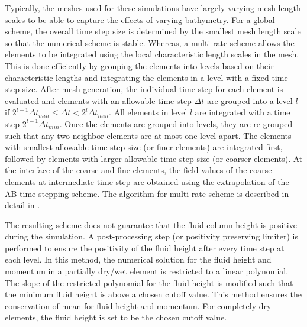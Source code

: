 Typically, the meshes used for these simulations have largely varying mesh length scales to be able to capture the effects of varying bathymetry. For a global scheme, the overall time step size is determined by the smallest mesh length scale so that the numerical scheme is stable. Whereas, a multi-rate scheme allows the elements to be integrated using the local characteristic length scales in the mesh. This is done efficiently by grouping the elements into levels based on their characteristic lengths and integrating the elements in a level with a fixed time step size. After mesh generation, the individual time step for each element is evaluated and elements with an allowable time step $\Delta t$ are grouped into a level $l$ if $2^{l-1} \Delta t _{min} \le \Delta t < 2^l \Delta t _{min}$. All elements in level $l$ are integrated with a time step $2^{l-1} \Delta t_{min}$. Once the elements are grouped into levels, they are re-grouped such that any two neighbor elements are at most one level apart. The elements with smallest allowable time step size (or finer elements) are integrated first, followed by elements with larger allowable time step size (or coarser elements). At the interface of the coarse and fine elements, the field values of the coarse elements at intermediate time step are obtained using the extrapolation of the AB time stepping scheme. The algorithm for multi-rate scheme is described in detail in \cite{gandham2014swe}. 

The resulting scheme does not guarantee that the fluid column height is positive during the simulation. A post-processing step (or positivity preserving limiter) is performed to ensure the positivity of the fluid height after every time step at each level. In this method, the numerical solution for the fluid height and momentum in a partially dry/wet element is restricted to a linear polynomial. The slope of the restricted polynomial for the fluid height is modified such that the minimum fluid height is above a chosen cutoff value. This method ensures the conservation of mean for fluid height and momentum. For completely dry elements, the fluid height is set to be the chosen cutoff value.
